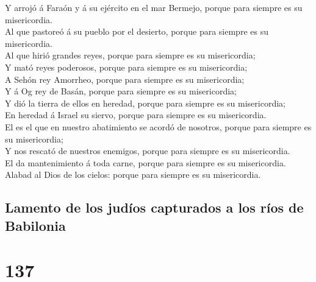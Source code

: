  Y arrojó á Faraón y á su ejército en el mar Bermejo,
porque para siempre es su misericordia.\\
 Al que pastoreó á su pueblo por el desierto, porque para
siempre es su misericordia.\\
 Al que hirió grandes reyes, porque para siempre es su
misericordia;\\
 Y mató reyes poderosos, porque para siempre es su
misericordia;\\
 A Sehón rey Amorrheo, porque para siempre es su
misericordia;\\
 Y á Og rey de Basán, porque para siempre es su
misericordia;\\
 Y dió la tierra de ellos en heredad, porque para siempre
es su misericordia;\\
 En heredad á Israel su siervo, porque para siempre es su
misericordia.\\
 El es el que en nuestro abatimiento se acordó de
nosotros, porque para siempre es su misericordia;\\
 Y nos rescató de nuestros enemigos, porque para siempre
es su misericordia.\\
 El da mantenimiento á toda carne, porque para siempre es
su misericordia.\\
 Alabad al Dios de los cielos: porque para siempre es su
misericordia.

\hypertarget{lamento-de-los-juduxedos-capturados-a-los-ruxedos-de-babilonia}{%
\subsection{Lamento de los judíos capturados a los ríos de
Babilonia}\label{lamento-de-los-juduxedos-capturados-a-los-ruxedos-de-babilonia}}

\hypertarget{section-19-137}{%
\section{137}\label{section-19-137}}

